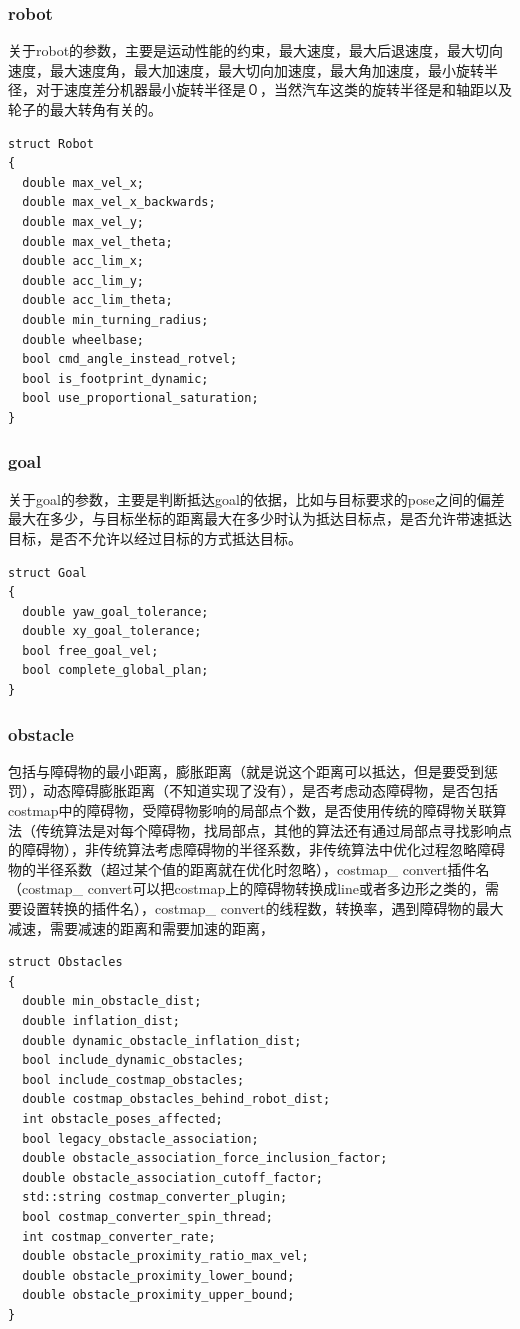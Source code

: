 \documentclass[10pt,a4paper]{article}
\theoremstyle{mythm}
\numberwithin{equation}{section}
\begin{document}
\subsubsection{robot}
关于robot的参数，主要是运动性能的约束，最大速度，最大后退速度，最大切向速度，最大速度角，最大加速度，最大切向加速度，最大角加速度，最小旋转半径，对于速度差分机器最小旋转半径是０，当然汽车这类的旋转半径是和轴距以及轮子的最大转角有关的。
\begin{lstlisting}[caption={robot结构体}]
struct Robot
{
  double max_vel_x;
  double max_vel_x_backwards;
  double max_vel_y;
  double max_vel_theta;
  double acc_lim_x;
  double acc_lim_y;
  double acc_lim_theta;
  double min_turning_radius;
  double wheelbase;
  bool cmd_angle_instead_rotvel;
  bool is_footprint_dynamic;
  bool use_proportional_saturation;
}
\end{lstlisting}
\subsubsection{goal}
关于goal的参数，主要是判断抵达goal的依据，比如与目标要求的pose之间的偏差最大在多少，与目标坐标的距离最大在多少时认为抵达目标点，是否允许带速抵达目标，是否不允许以经过目标的方式抵达目标。
\begin{lstlisting}[caption={goal结构体}]
struct Goal
{
  double yaw_goal_tolerance;
  double xy_goal_tolerance;
  bool free_goal_vel;
  bool complete_global_plan;
}
\end{lstlisting}
\subsubsection{obstacle}
包括与障碍物的最小距离，膨胀距离（就是说这个距离可以抵达，但是要受到惩罚），动态障碍膨胀距离（不知道实现了没有），是否考虑动态障碍物，是否包括costmap中的障碍物，受障碍物影响的局部点个数，是否使用传统的障碍物关联算法（传统算法是对每个障碍物，找局部点，其他的算法还有通过局部点寻找影响点的障碍物），非传统算法考虑障碍物的半径系数，非传统算法中优化过程忽略障碍物的半径系数（超过某个值的距离就在优化时忽略），costmap\_ convert插件名（costmap\_ convert可以把costmap上的障碍物转换成line或者多边形之类的，需要设置转换的插件名），costmap\_ convert的线程数，转换率，遇到障碍物的最大减速，需要减速的距离和需要加速的距离，
\begin{lstlisting}[caption={Obstacles结构体}]
struct Obstacles
{
  double min_obstacle_dist; 
  double inflation_dist;
  double dynamic_obstacle_inflation_dist;
  bool include_dynamic_obstacles;
  bool include_costmap_obstacles;
  double costmap_obstacles_behind_robot_dist;
  int obstacle_poses_affected;
  bool legacy_obstacle_association;
  double obstacle_association_force_inclusion_factor;
  double obstacle_association_cutoff_factor;
  std::string costmap_converter_plugin;
  bool costmap_converter_spin_thread;
  int costmap_converter_rate;
  double obstacle_proximity_ratio_max_vel;
  double obstacle_proximity_lower_bound;
  double obstacle_proximity_upper_bound;
}
\end{lstlisting}
\end{document}
